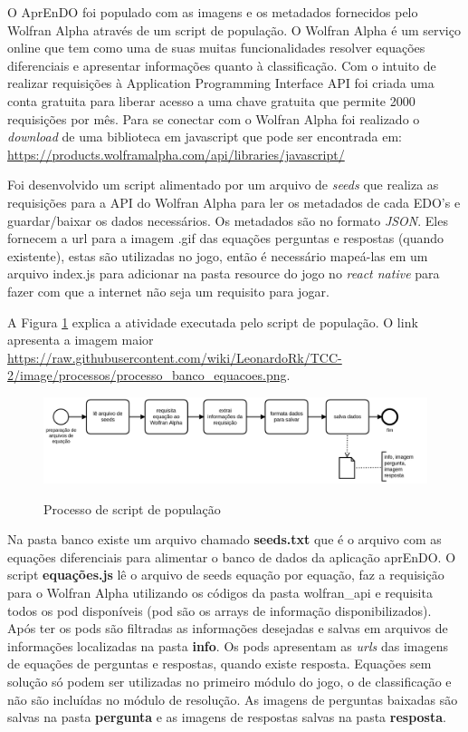 O AprEnDO foi populado com as imagens e os metadados fornecidos pelo Wolfran Alpha através de um script de população. O Wolfran Alpha é um serviço online que tem como uma de suas muitas funcionalidades resolver equações diferenciais e apresentar informações quanto à classificação. Com o intuito de realizar requisições à Application Programming Interface API foi criada uma conta gratuita para liberar acesso a uma chave gratuita que permite 2000 requisições por mês. Para se conectar com o Wolfran Alpha foi realizado o \textit{download} de uma biblioteca em javascript que pode ser encontrada em: \url{https://products.wolframalpha.com/api/libraries/javascript/} 

Foi desenvolvido um script alimentado por um arquivo de \textit{seeds} que realiza as requisições para a API do Wolfran Alpha para ler os metadados de cada EDO's e guardar/baixar os dados necessários. Os metadados são no formato \textit{JSON}. Eles fornecem a url para a imagem .gif das equações perguntas e respostas (quando existente), estas são utilizadas no jogo, então é necessário mapeá-las em um arquivo index.js para adicionar na pasta resource do jogo no \textit{react native} para fazer com que a internet não seja um requisito para jogar.
 
A Figura \ref{fig:processopopulacao} explica a atividade executada pelo script de população.
O link apresenta a imagem maior \url{https://raw.githubusercontent.com/wiki/LeonardoRk/TCC-2/image/processos/processo_banco_equacoes.png}.  

\begin{figure}[H]
\caption{Processo de script de população}
\includegraphics[width=\textwidth,height=\textheight, keepaspectratio]{figuras/processos/processo_banco_equacoes.png}
\label{fig:processopopulacao}
\end{figure}
Na pasta banco existe um arquivo chamado \textbf{seeds.txt} que é o arquivo com as equações diferenciais para alimentar o banco de dados da aplicação aprEnDO. O script \textbf{equações.js} lê o arquivo de seeds equação por equação, faz a requisição para o Wolfran Alpha utilizando os códigos da pasta wolfran\_api e requisita todos os pod disponíveis (pod são os arrays de informação disponibilizados). Após ter os pods são filtradas as informações desejadas e salvas em arquivos de informações localizadas na pasta \textbf{info}. Os pods apresentam as \textit{urls} das imagens de equações de perguntas e respostas, quando existe resposta. Equações sem solução só podem ser utilizadas no primeiro módulo do jogo, o de classificação e não são incluídas no módulo de resolução. As imagens de perguntas baixadas são salvas na pasta \textbf{pergunta} e as imagens de respostas salvas na pasta \textbf{resposta}.

